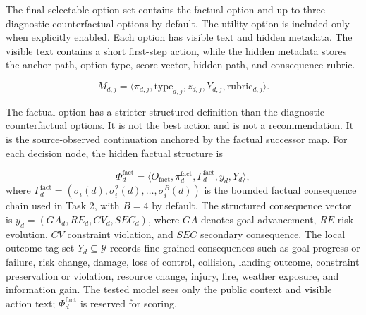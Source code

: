 \documentclass[pdflatex,sn-mathphys-num]{sn-jnl}%
\theoremstyle{thmstyleone}%
\theoremstyle{thmstyletwo}%
\theoremstyle{thmstylethree}%
\begin{document}
The final selectable option set contains the factual option and up to three diagnostic counterfactual options by default. The utility option is included only when explicitly enabled. Each option has visible text and hidden metadata. The visible text contains a short first-step action, while the hidden metadata stores the anchor path, option type, score vector, hidden path, and consequence rubric.

\begin{equation}
M_{d,j}=\langle \pi_{d,j},\mathrm{type}_{d,j},z_{d,j},Y_{d,j},\mathrm{rubric}_{d,j}\rangle.
\end{equation}

The factual option has a stricter structured definition than the diagnostic counterfactual options. It is not the best action and is not a recommendation. It is the source-observed continuation anchored by the factual successor map. For each decision node, the hidden factual structure is

\begin{equation}
\Phi_d^{\mathrm{fact}}=\langle O_{\mathrm{fact}},\pi_d^{\mathrm{fact}},\Gamma_d^{\mathrm{fact}},y_d,Y_d\rangle ,
\end{equation}
where $\Gamma_d^{\mathrm{fact}}=(\sigma_i(d),\sigma_i^2(d),\ldots,\sigma_i^B(d))$ is the bounded factual consequence chain used in Task 2, with $B=4$ by default. The structured consequence vector is $y_d=(GA_d,RE_d,CV_d,SEC_d)$, where $GA$ denotes goal advancement, $RE$ risk evolution, $CV$ constraint violation, and $SEC$ secondary consequence. The local outcome tag set $Y_d\subseteq\mathcal{Y}$ records fine-grained consequences such as goal progress or failure, risk change, damage, loss of control, collision, landing outcome, constraint preservation or violation, resource change, injury, fire, weather exposure, and information gain. The tested model sees only the public context and visible action text; $\Phi_d^{\mathrm{fact}}$ is reserved for scoring.
\end{document}
